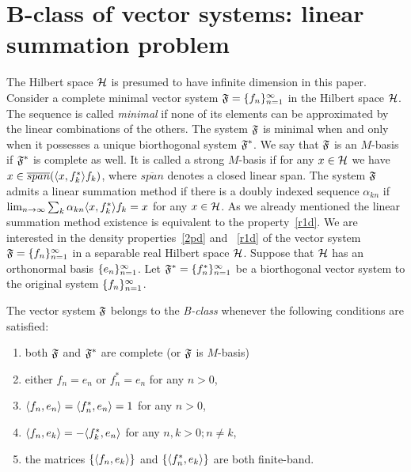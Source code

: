 \documentclass[12pt]{amsart}
\begin{document}
\section{B-class of vector systems: linear summation problem}
    \label{fsys2graphs}
    The Hilbert space $\cal{H}$ is presumed to have infinite dimension in this paper.
    Consider a complete minimal vector system $\fsys = \seq{f}$ in the Hilbert space $\cal{H}$.
    The sequence is called \emph{minimal} if none of its elements can be approximated by the linear combinations of the others.
    The system $\fsys$ is minimal when and only when it possesses a unique biorthogonal system $\fstarsys$.
    We say that $\fsys$ is an $M$-basis if $\fstarsys$ is complete as well.
    It is called a strong $M$-basis if for any $x\in\cal{H}$ we have $x \in \overline{span}(\inner{x}{f^*_k}f_k)$, where
      $\overline{span}$ denotes a closed linear span.
    The system $\fsys$ admits a linear summation method if there is a doubly indexed sequence $\alpha_{kn}$ if
      $\lim_{n \to \infty} \sum_k \alpha_{kn} \inner{x}{f^*_k}f_k = x$ for any $x \in \cal{H}$.
    As we already mentioned the linear summation method existence is equivalent to the property~\ref{r1d}.
    We are interested in the density properties~\ref{2pd} and ~\ref{r1d} of the vector system $\fsys = \seq{f}$
      in a separable real Hilbert space $\cal{H}$. 
    Suppose that $\cal{H}$ has an orthonormal basis $\seq{e}$.
    Let $\fstarsys = \{f_n^{*}\}_{n=1}^\infty$ be a biorthogonal vector system to the original system $\seq{f}$.
    \begin{definition}
      The vector system $\fsys$ belongs to the \emph{B-class} whenever the following conditions are satisfied:
      \begin{enumerate}[label=\textbf{C\arabic*}]
        \item \label{c1} both $\fsys$ and $\fstarsys$ are complete (or $\fsys$ is $M$-basis)
        \item either $f_n = e_n$ or $f^*_n = e_n$ for any $n > 0$,
        \item \label{c3} $\inner{f_n}{e_n} = \inner{f^*_n}{e_n} = 1$ for any $n > 0$,
        \item \label{c4} $\inner{f_n}{e_k} = -\inner{f^*_k}{e_n}$ for any $n, k > 0; n \neq k$,
        \item \label{c5} the matrices $\{\inner{f_n}{e_k}\}$ and $\{\inner{f^*_n}{e_k}\}$ are both finite-band.
      \end{enumerate}
    \end{definition}
\end{document}
